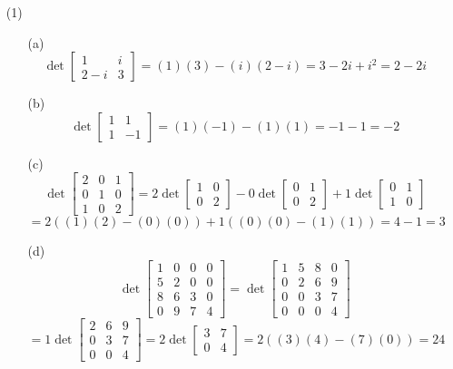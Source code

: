 \begin{itemize}
\item[(1)]
\begin{itemize}
\item[(a)]
$$\det\begin{bmatrix}
1 & i \\
2 - i & 3
\end{bmatrix} = (1)(3) - (i)(2 - i) = 3 - 2i + i^2 = 2 - 2i$$
\item[(b)]
$$\det\begin{bmatrix}
1 & 1 \\
1 & -1
\end{bmatrix} = (1)(-1) - (1)(1) = -1 - 1 = -2$$
\item[(c)]
$$\det\begin{bmatrix}
2 & 0 & 1 \\
0 & 1 & 0 \\
1 & 0 & 2
\end{bmatrix} = 2\det\begin{bmatrix}
1 & 0 \\
0 & 2
\end{bmatrix} - 0\det\begin{bmatrix}
0 & 1 \\
0 & 2
\end{bmatrix} + 1\det\begin{bmatrix}
0 & 1 \\
1 & 0
\end{bmatrix}$$
$$= 2((1)(2) - (0)(0)) + 1((0)(0) - (1)(1)) = 4 - 1 = 3$$
\item[(d)]
$$\det\begin{bmatrix}
1 & 0 & 0 & 0 \\
5 & 2 & 0 & 0 \\
8 & 6 & 3 & 0 \\
0 & 9 & 7 & 4
\end{bmatrix} = \det\begin{bmatrix}
1 & 5 & 8 & 0 \\
0 & 2 & 6 & 9 \\
0 & 0 & 3 & 7 \\
0 & 0 & 0 & 4
\end{bmatrix} $$
$$= 1\det\begin{bmatrix}
2 & 6 & 9 \\
0 & 3 & 7 \\
0 & 0 & 4
\end{bmatrix} = 2\det\begin{bmatrix}
3 & 7 \\
0 & 4
\end{bmatrix} = 2((3)(4) - (7)(0)) = 24$$

\end{itemize}
\end{itemize}
